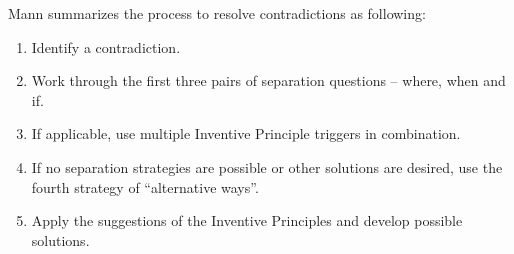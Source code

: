 \documentclass[11pt,a4paper]{article}
\begin{document}
Mann summarizes the process to resolve contradictions as following:

\begin{enumerate}
\item Identify a contradiction.
\item Work through the first three pairs of separation questions -- where,
  when and if.
\item If applicable, use multiple Inventive Principle triggers in
  combination. 
\item If no separation strategies are possible or other solutions are desired,
  use the fourth strategy of \enquote{alternative ways}.
\item Apply the suggestions of the Inventive Principles and develop possible
  solutions.
\end{enumerate}
\end{document}
